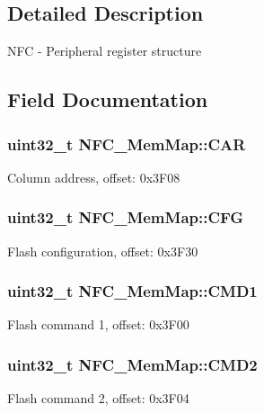 \subsection{Detailed Description}
N\+F\+C -\/ Peripheral register structure 

\subsection{Field Documentation}
\hypertarget{struct_n_f_c___mem_map_aa3489d3c17a78186e56e52e2a6a13fd5}{}
\subsubsection[{C\+A\+R}]{\setlength{\rightskip}{0pt plus 5cm}uint32\+\_\+t N\+F\+C\+\_\+\+Mem\+Map\+::\+C\+A\+R}\label{struct_n_f_c___mem_map_aa3489d3c17a78186e56e52e2a6a13fd5}
Column address, offset\+: 0x3\+F08 \hypertarget{struct_n_f_c___mem_map_ae368f579cd01d726ce07b35082b929ac}{}
\subsubsection[{C\+F\+G}]{\setlength{\rightskip}{0pt plus 5cm}uint32\+\_\+t N\+F\+C\+\_\+\+Mem\+Map\+::\+C\+F\+G}\label{struct_n_f_c___mem_map_ae368f579cd01d726ce07b35082b929ac}
Flash configuration, offset\+: 0x3\+F30 \hypertarget{struct_n_f_c___mem_map_a38a4f2f5e205a3efabe1b57a630df44a}{}
\subsubsection[{C\+M\+D1}]{\setlength{\rightskip}{0pt plus 5cm}uint32\+\_\+t N\+F\+C\+\_\+\+Mem\+Map\+::\+C\+M\+D1}\label{struct_n_f_c___mem_map_a38a4f2f5e205a3efabe1b57a630df44a}
Flash command 1, offset\+: 0x3\+F00 \hypertarget{struct_n_f_c___mem_map_a0445e1306dc6c5367e5fcbe28af5549d}{}
\subsubsection[{C\+M\+D2}]{\setlength{\rightskip}{0pt plus 5cm}uint32\+\_\+t N\+F\+C\+\_\+\+Mem\+Map\+::\+C\+M\+D2}\label{struct_n_f_c___mem_map_a0445e1306dc6c5367e5fcbe28af5549d}
Flash command 2, offset\+: 0x3\+F04 \hypertarget{struct_n_f_c___mem_map_a32bec2bfd84ae10fe9ddaaab24ff5c22}{}
